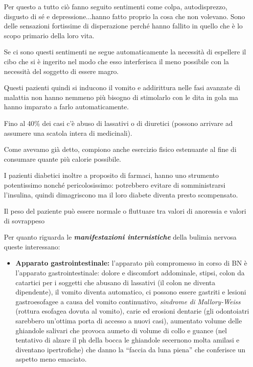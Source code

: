 Per questo a tutto ciò fanno seguito sentimenti come colpa,
autodisprezzo, disgusto di sé e depressione...hanno fatto proprio la
cosa che non volevano. Sono delle sensazioni fortissime di disperazione
perché hanno fallito in quello che è lo scopo primario della loro vita.

Se ci sono questi sentimenti ne segue automaticamente la necessità di
espellere il cibo che si è ingerito nel modo che esso interferisca il
meno possibile con la necessità del soggetto di essere magro.

Questi pazienti quindi si inducono il vomito e addirittura nelle fasi
avanzate di malattia non hanno nemmeno più bisogno di stimolarlo con le
dita in gola ma hanno imparato a farlo automaticamente.

Fino al 40\% dei casi c'è abuso di lassativi o di diuretici (possono
arrivare ad assumere una scatola intera di medicinali).

Come avevamo già detto, compiono anche esercizio fisico estenuante al
fine di consumare quante più calorie possibile.

I pazienti diabetici inoltre a proposito di farmaci, hanno uno strumento
potentissimo nonché pericolosissimo: potrebbero evitare di
somministrarsi l'insulina, quindi dimagriscono ma il loro diabete
diventa presto scompensato.

Il peso del paziente può essere normale o fluttuare tra valori di
anoressia e valori di sovrappeso

Per quanto riguarda le \textbf{\emph{manifestazioni internistiche}}
della bulimia nervosa queste interessano:

\begin{itemize}
\item
  \textbf{Apparato gastrointestinale:} l'apparato più compromesso in
  corso di BN è l'apparato gastrointestinale: dolore e discomfort
  addominale, stipsi, colon da catartici per i soggetti che abusano di
  lassativi (il colon ne diventa dipendente), il vomito diventa
  automatico, ci possono essere gastriti e lesioni gastroesofagee a
  causa del vomito continuativo, \emph{sindrome di Mallory-Weiss}
  (rottura esofagea dovuta al vomito), carie ed erosioni dentarie (gli
  odontoiatri sarebbero un'ottima porta di accesso a nuovi casi),
  aumentato volume delle ghiandole salivari che provoca aumeto di volume
  di collo e guance (nel tentativo di alzare il ph della bocca le
  ghiandole secernono molta amilasi e diventano ipertrofiche) che danno
  la ``faccia da luna piena'' che conferisce un aspetto meno emaciato.
\end{itemize}

